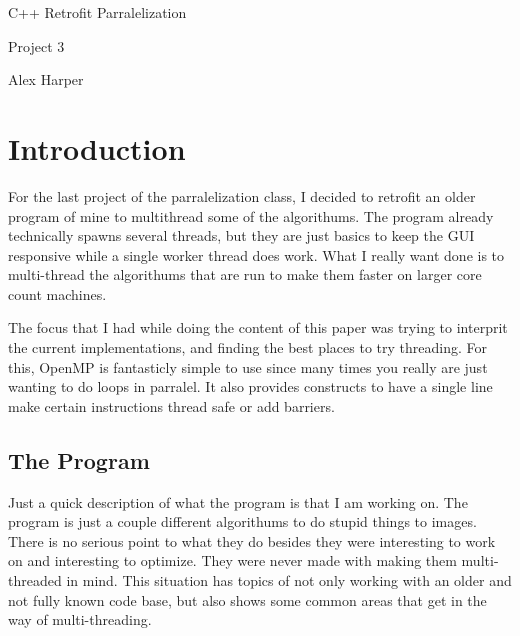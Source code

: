 \documentclass[12pt]{article}
\begin{document}
\begin{titlepage}
	\centering
	{\Huge C++ Retrofit Parralelization\par}
	\vspace{0.25in}
	{\Large Project 3\par}
	\vspace{2in}
	{Alex Harper\par}
	\newpage
\end{titlepage}

\tableofcontents
\newpage

\listoffigures
\newpage
\setlength{\parindent}{4em}
\setlength{\parskip}{1em}


\section{Introduction}

For the last project of the parralelization class, I decided to retrofit an older program of mine to multithread some of the algorithums.
The program already technically spawns several threads, but they are just basics to keep the GUI responsive while a single worker thread does work.
What I really want done is to multi-thread the algorithums that are run to make them faster on larger core count machines.

The focus that I had while doing the content of this paper was trying to interprit the current implementations, and finding the best places to try threading.
For this, OpenMP is fantasticly simple to use since many times you really are just wanting to do loops in parralel.
It also provides constructs to have a single line make certain instructions thread safe or add barriers.

\subsection{The Program}

Just a quick description of what the program is that I am working on.
The program is just a couple different algorithums to do stupid things to images.
There is no serious point to what they do besides they were interesting to work on and interesting to optimize.
They were never made with making them multi-threaded in mind.
This situation has topics of not only working with an older and not fully known code base, but also shows some common areas that get in the way of multi-threading.
\end{document}
